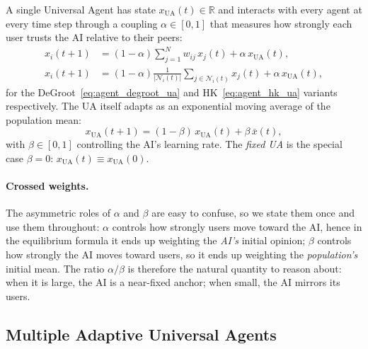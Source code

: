 \documentclass{article}
\theoremstyle{plain}
\theoremstyle{definition}
\theoremstyle{remark}
\newcommand{\xUA}{x_{\mathrm{UA}}}
\newcommand{\xbar}{\bar{x}}
\newcommand{\Ni}{\mathcal{N}_i}
\begin{document}
A single Universal Agent has state $\xUA(t)\in\mathbb{R}$ and
interacts with every agent at every time step through a coupling
$\alpha\in[0,1]$ that measures how strongly each user trusts the AI
relative to their peers:
\begin{align}
    x_i(t+1)
    &= (1-\alpha)\sum_{j=1}^N w_{ij}\,x_j(t)
       + \alpha\,\xUA(t),
    \label{eq:agent_degroot_ua}\\
    x_i(t+1)
    &= (1-\alpha)\frac{1}{|\Ni(t)|}\sum_{j\in\Ni(t)} x_j(t)
       + \alpha\,\xUA(t),
    \label{eq:agent_hk_ua}
\end{align}
for the DeGroot~\eqref{eq:agent_degroot_ua} and
HK~\eqref{eq:agent_hk_ua} variants respectively.  The UA itself
adapts as an exponential moving average of the population mean:
\begin{equation}
    \xUA(t+1) = (1-\beta)\,\xUA(t) + \beta\,\xbar(t),
    \label{eq:ua_update}
\end{equation}
with $\beta\in[0,1]$ controlling the AI's learning rate.  The
\emph{fixed UA} is the special case $\beta=0$: $\xUA(t)\equiv\xUA(0)$.

\paragraph{Crossed weights.}
The asymmetric roles of $\alpha$ and $\beta$ are easy to confuse, so
we state them once and use them throughout: $\alpha$ controls how
strongly users move toward the AI, hence in the equilibrium formula
it ends up weighting the \emph{AI's} initial opinion;
$\beta$ controls how strongly the AI moves toward users, so it ends
up weighting the \emph{population's} initial mean.  The ratio
$\alpha/\beta$ is therefore the natural quantity to reason about:
when it is large, the AI is a near-fixed anchor; when small, the AI
mirrors its users.

\subsection{Multiple Adaptive Universal Agents}
\label{subsec:multi-ua}
\end{document}
